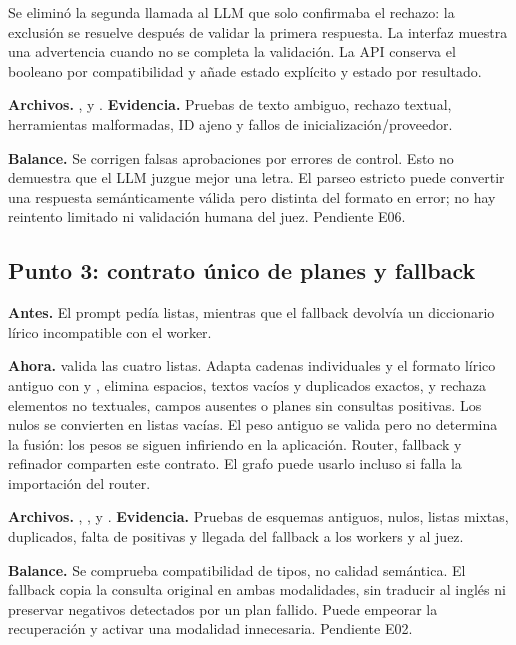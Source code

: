 Se eliminó la segunda llamada al LLM que solo confirmaba el rechazo: la exclusión
se resuelve después de validar la primera respuesta. La interfaz muestra una
advertencia cuando no se completa la validación. La API conserva el booleano
 por compatibilidad y añade estado explícito y estado por resultado.

\textbf{Archivos.} ,  y .
\textbf{Evidencia.} Pruebas de texto ambiguo, rechazo textual, herramientas
malformadas, ID ajeno y fallos de inicialización/proveedor.

\textbf{Balance.} Se corrigen falsas aprobaciones por errores de control. Esto no
demuestra que el LLM juzgue mejor una letra. El parseo estricto puede convertir
una respuesta semánticamente válida pero distinta del formato en error; no hay
reintento limitado ni validación humana del juez. Pendiente E06.

\subsection{Punto 3: contrato único de planes y fallback}
\label{cambio:3}
\textbf{Antes.} El prompt pedía listas, mientras que el fallback devolvía un
diccionario lírico incompatible con el worker.

\textbf{Ahora.}  valida las cuatro listas. Adapta cadenas
individuales y el formato lírico antiguo con  y , elimina
espacios, textos vacíos y duplicados exactos, y rechaza elementos no textuales,
campos ausentes o planes sin consultas positivas. Los nulos se convierten en
listas vacías. El peso antiguo se valida pero no determina la fusión: los pesos
se siguen infiriendo en la aplicación. Router, fallback y refinador comparten
este contrato. El grafo puede usarlo incluso si falla la importación del router.

\textbf{Archivos.} , ,
 y .
\textbf{Evidencia.} Pruebas de esquemas antiguos, nulos, listas mixtas, duplicados,
falta de positivas y llegada del fallback a los workers y al juez.

\textbf{Balance.} Se comprueba compatibilidad de tipos, no calidad semántica.
El fallback copia la consulta original en ambas modalidades, sin traducir al
inglés ni preservar negativos detectados por un plan fallido. Puede empeorar
la recuperación y activar una modalidad innecesaria. Pendiente E02.

